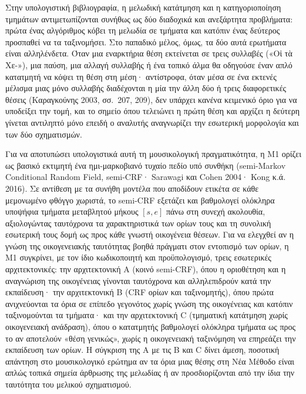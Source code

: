 \documentclass[11pt,a4paper]{article}
\begin{document}
Στην υπολογιστική βιβλιογραφία, η μελωδική κατάτμηση και η κατηγοριοποίηση τμημάτων αντιμετωπίζονται συνήθως ως δύο διαδοχικά και ανεξάρτητα προβλήματα: πρώτα ένας αλγόριθμος κόβει τη μελωδία σε τμήματα και κατόπιν ένας δεύτερος προσπαθεί να τα ταξινομήσει. Στο παπαδικό μέλος, όμως, τα δύο αυτά ερωτήματα είναι αλληλένδετα. Όταν μια εναρκτήρια θέση εκτείνεται σε τρεις συλλαβές («Οἱ τὰ Χε-»), μια παύση, μια αλλαγή συλλαβής ή ένα τοπικό άλμα θα οδηγούσε έναν απλό κατατμητή να κόψει τη θέση στη μέση· αντίστροφα, όταν μέσα σε ένα εκτενές μέλισμα μιας μόνο συλλαβής διαδέχονται η μία την άλλη δύο ή τρεις διαφορετικές θέσεις (Καραγκούνης 2003, σσ.~207, 209), δεν υπάρχει κανένα κειμενικό όριο για να υποδείξει την τομή, και το σημείο όπου τελειώνει η πρώτη θέση και αρχίζει η δεύτερη γίνεται αντιληπτό μόνο επειδή ο αναλυτής αναγνωρίζει την εσωτερική μορφολογία και των δύο σχηματισμών.

Για να αποτυπώσει υπολογιστικά αυτή τη μουσικολογική πραγματικότητα, η Μ1 ορίζει ως βασικό εκτιμητή ένα ημι-μαρκοβιανό τυχαίο πεδίο υπό συνθήκη (semi-Markov Conditional Random Field, semi-CRF· Sarawagi και Cohen 2004· Kong κ.ά. 2016). Σε αντίθεση με τα συνήθη μοντέλα που αποδίδουν ετικέτα σε κάθε μεμονωμένο φθόγγο χωριστά, το semi-CRF εξετάζει και βαθμολογεί ολόκληρα υποψήφια τμήματα μεταβλητού μήκους $[s,e]$ πάνω στη συνεχή ακολουθία, αξιολογώντας ταυτόχρονα τα χαρακτηριστικά των ορίων τους και τη συνολική εσωτερική τους δομή ως προς κάθε γνωστή οικογένεια θέσεων. Για να ελεγχθεί αν η γνώση της οικογενειακής ταυτότητας βοηθά πράγματι στον εντοπισμό των ορίων, η Μ1 συγκρίνει, με τον ίδιο κωδικοποιητή και προϋπολογισμό, τρεις εσωτερικές αρχιτεκτονικές: την αρχιτεκτονική A (κοινό semi-CRF), όπου η οριοθέτηση και η αναγνώριση της οικογένειας γίνονται ταυτόχρονα και αλληλεπιδρούν κατά την εκπαίδευση· την αρχιτεκτονική B (CRF ορίων και ταξινομητής), όπου πρώτα ανιχνεύονται τα όρια σε επίπεδο γεγονότος χωρίς γνώση της οικογένειας και κατόπιν ταξινομούνται τα τμήματα· και την αρχιτεκτονική C (τμηματική κατάτμηση χωρίς οικογενειακή ανάδραση), όπου ο κατατμητής βαθμολογεί ολόκληρα τμήματα ως προς το αν αποτελούν «θέση γενικώς», χωρίς η οικογενειακή ταξινόμηση να επηρεάζει την εκπαίδευση των ορίων. Η σύγκριση της A με τις B και C δίνει άμεση, ποσοτική απάντηση στο μουσικολογικό ερώτημα αν τα όρια μιας θέσης στη Νέα Μέθοδο είναι απλώς τοπικά σημεία άρθρωσης της μελωδίας ή αν προσδιορίζονται από την ίδια την ταυτότητα του μελικού σχηματισμού.
\end{document}
